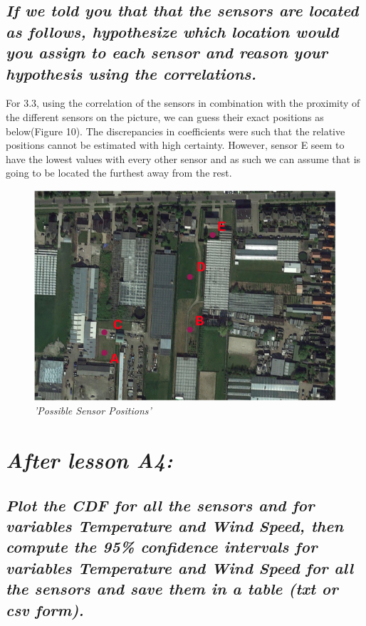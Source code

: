\documentclass[a4paper,12pt]{article}
\begin{document}
\subsection{\it If we told you that that the sensors are located as follows, hypothesize which location would you assign to each sensor and reason your hypothesis using the correlations.}




For 3.3, using the correlation of the sensors in combination with the proximity of the different sensors on the picture, we can guess their exact positions as below(Figure 10). 
The discrepancies in coefficients were such that the relative positions cannot 
be estimated with high certainty. However, sensor E seem to have the lowest values with every other sensor and as such we can assume that is going to be located the furthest away from the rest.



\begin{figure}[H]
\centering
\includegraphics[width=\textwidth]{Graphs/SensorsSketch.png}
\caption{\it'Possible Sensor Positions'}
\end{figure}




\section{\it After lesson A4:}
\subsection{\it Plot the CDF for all the sensors and for variables Temperature and Wind Speed, then compute the 95\% confidence intervals for variables Temperature and Wind Speed for all the sensors and save them in a table (txt or csv form).}
\end{document}
